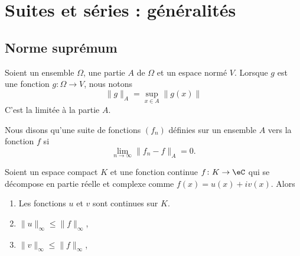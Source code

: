
\section{Suites et séries : généralités}
\label{SECooTDZNooJvjPks}

\subsection{Norme suprémum}

\begin{definition}
	Soient un ensemble \( \Omega\), une partie \( A\) de \( \Omega\) et un espace normé \( V\). Lorsque \( g\) est une fonction \( g\colon \Omega\to V\), nous notons
	\begin{equation}
		\| g \|_A=\sup_{x\in A}\| g(x) \|
	\end{equation}
	C'est la  limitée à la partie \( A\).

	Nous disons qu'une suite de fonctions \( (f_n)\) définies sur un ensemble \( A\)  vers la fonction \( f\) si
	\begin{equation}
		\lim_{n\to \infty} \| f_n-f \|_A=0.
	\end{equation}
\end{definition}

\begin{lemma}       \label{LEMooLPRZooUPsWTR}
	Soient un espace compact \( K\) et une fonction continue \( f\colon K\to \eC\) qui se décompose en partie réelle et complexe comme \( f(x)=u(x)+iv(x)\). Alors
	\begin{enumerate}
		\item
		      Les fonctions \( u\) et \( v\) sont continues sur \( K\).
		\item
		      \( \| u \|_{\infty}\leq \| f \|_{\infty}\),
		\item
		      \( \| v \|_{\infty}\leq \| f \|_{\infty}\),
	\end{enumerate}
\end{lemma}

